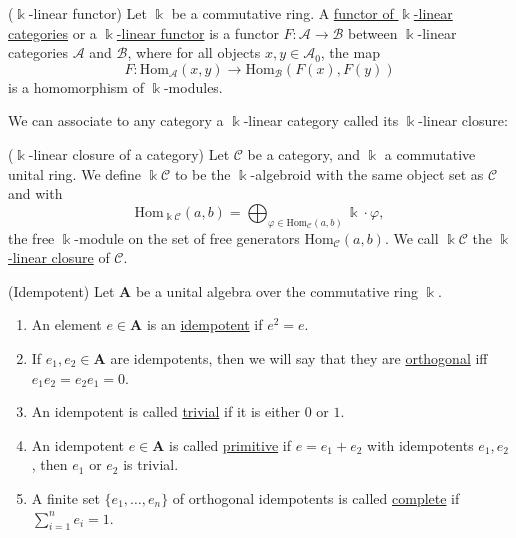 \begin{definition}{($\Bbbk$-linear functor)}
Let $\Bbbk$ be a commutative ring. A \ul{functor of $\Bbbk$-linear categories} or a \ul{$\Bbbk$-linear functor} is a functor
$F : \mathcal{A} \rightarrow \mathcal{B}$ between $\Bbbk$-linear categories $\mathcal{A}$ and $\mathcal{B}$,
where for all objects $x, y \in \mathcal{A}_{0}$, the map
\[
F : \mathrm{Hom}_{\mathcal{A}}(x,y) \rightarrow \mathrm{Hom}_{\mathcal{B}}(F(x), F(y))
\]
is a homomorphism of $\Bbbk$-modules.
\end{definition}

\noindent We can associate to any category a $\Bbbk$-linear category called its $\Bbbk$-linear closure:

\begin{definition}{($\Bbbk$-linear closure of a category)}
Let $\mathcal{C}$ be a category, and $\Bbbk$ a commutative unital ring. We define $\Bbbk \mathcal{C}$ to be
the $\Bbbk$-algebroid with the same object set as $\mathcal{C}$ and with 
\[
\mathrm{Hom}_{\Bbbk\mathcal{C}}(a,b) = \bigoplus_{\varphi \in \mathrm{Hom}_{\mathcal{C}}(a,b)} \Bbbk \cdot \varphi,
\]
the free $\Bbbk$-module on the set of free generators $\mathrm{Hom}_{\mathcal{C}}(a,b)$. We call $\Bbbk\mathcal{C}$ the
\ul{$\Bbbk$-linear closure} of $\mathcal{C}$.
\end{definition}

\begin{definition}{(Idempotent)}\label{def:idempotent}
Let $\mathbf{A}$ be a unital algebra over the commutative ring $\Bbbk$.
\begin{enumerate}
\renewcommand{\labelenumi}{(\theenumi)}
\item An element $e\in \mathbf{A}$ is an \ul{idempotent} if $e^{2} = e$.
\item If $e_{1}, e_{2} \in \mathbf{A}$ are idempotents, then we will say that they are \ul{orthogonal} iff $e_{1}e_{2} = e_{2}e_{1} = 0$.
\item An idempotent is called \ul{trivial} if it is either $0$ or $1$.
\item An idempotent $e \in \mathbf{A}$ is called \ul{primitive} if $e = e_{1} + e_{2}$ with idempotents $e_{1}, e_{2}$, then
$e_{1}$ or $e_{2}$ is trivial.
\item A finite set $\{e_{1},\dots,e_{n}\}$ of orthogonal idempotents is called \ul{complete} if $\sum_{i=1}^{n} e_{i} = 1$.
\end{enumerate}
\end{definition}


